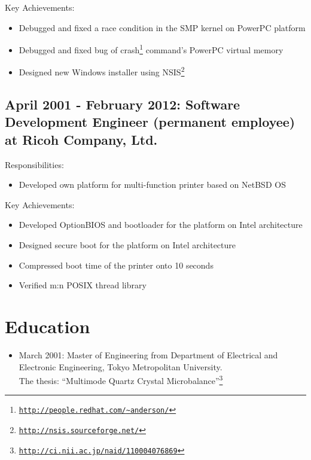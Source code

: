 \documentclass[letterpaper]{article}
\begin{document}
\noindent Key Achievements:

\begin{itemize}
  \item Debugged and fixed a race condition in the SMP kernel on PowerPC platform
  \item Debugged and fixed bug of crash\footnote{\href{http://people.redhat.com/{\textasciitilde}anderson/}{\tt http://people.redhat.com/{\textasciitilde}anderson/}} command's PowerPC virtual memory
  \item Designed new Windows installer using NSIS\footnote{\href{http://nsis.sourceforge.net/}{\tt http://nsis.sourceforge.net/}}
\end{itemize}

\subsection*{April 2001 - February 2012: Software Development Engineer (permanent employee) at Ricoh Company, Ltd.}

\noindent Responsibilities:

\begin{itemize}
  \item Developed own platform for multi-function printer based on NetBSD OS
\end{itemize}

\noindent Key Achievements:

\begin{itemize}
  \item Developed OptionBIOS and bootloader for the platform on Intel architecture
  \item Designed secure boot for the platform on Intel architecture
  \item Compressed boot time of the printer onto 10 seconds
  \item Verified m:n POSIX thread library
\end{itemize}

\section*{Education}

\begin{itemize}
  \item March 2001: Master of Engineering from Department of Electrical and Electronic Engineering, Tokyo Metropolitan University. \\
    The thesis: ``Multimode Quartz Crystal Microbalance''\footnote{\href{http://ci.nii.ac.jp/naid/110004076869}{\tt http://ci.nii.ac.jp/naid/110004076869}}
\end{itemize}
\end{document}

